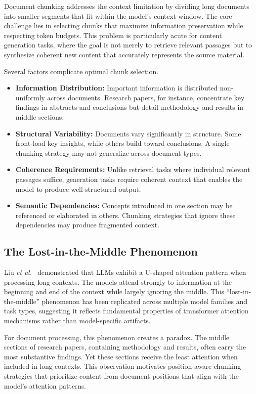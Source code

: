 \documentclass{ieeeaccess}
\begin{document}
Document chunking addresses the context limitation by dividing long documents into smaller segments that fit within the model's context window. The core challenge lies in selecting chunks that maximize information preservation while respecting token budgets. This problem is particularly acute for content generation tasks, where the goal is not merely to retrieve relevant passages but to synthesize coherent new content that accurately represents the source material.

Several factors complicate optimal chunk selection.

\begin{itemize}
    \item \textbf{Information Distribution:} Important information is distributed non-uniformly across documents. Research papers, for instance, concentrate key findings in abstracts and conclusions but detail methodology and results in middle sections.
    \item \textbf{Structural Variability:} Documents vary significantly in structure. Some front-load key insights, while others build toward conclusions. A single chunking strategy may not generalize across document types.
    \item \textbf{Coherence Requirements:} Unlike retrieval tasks where individual relevant passages suffice, generation tasks require coherent context that enables the model to produce well-structured output.
    \item \textbf{Semantic Dependencies:} Concepts introduced in one section may be referenced or elaborated in others. Chunking strategies that ignore these dependencies may produce fragmented context.
\end{itemize}

\subsection{The Lost-in-the-Middle Phenomenon}

Liu \emph{et al.}~\cite{b1} demonstrated that LLMs exhibit a U-shaped attention pattern when processing long contexts. The models attend strongly to information at the beginning and end of the context while largely ignoring the middle. This ``lost-in-the-middle'' phenomenon has been replicated across multiple model families and task types, suggesting it reflects fundamental properties of transformer attention mechanisms rather than model-specific artifacts.

For document processing, this phenomenon creates a paradox. The middle sections of research papers, containing methodology and results, often carry the most substantive findings. Yet these sections receive the least attention when included in long contexts. This observation motivates position-aware chunking strategies that prioritize content from document positions that align with the model's attention patterns.
\end{document}
